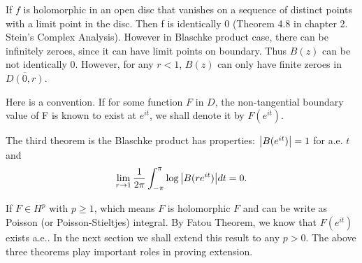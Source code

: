 \begin{remark}
    If $f$ is holomorphic in an open disc that vanishes on a sequence of distinct points with a limit point in the disc.
    Then f is identically 0 (Theorem 4.8 in chapter 2. Stein's Complex Analysis). However in Blaschke product case, there can
    be infinitely zeroes, since it can have limit points on boundary. Thus $B(z)$ can be not identically 0. However, for any $r<1$,
    $B(z)$ can only have finite zeroes in $\overline{D(0,r)}$.
\end{remark}
Here is a convention. If for some function $F$ in $D$, the non-tangential boundary value of F is known to exist at $e^{it}$, we shall denote it by
$F(e^{it})$. \par
The third theorem is the Blaschke
product has properties: $\left\lvert B(e^{it})\right\rvert=1$ for a.e. $t$ and
\begin{equation*}
    \lim_{r\to 1}{\frac{1}{2\pi}\int_{-\pi}^\pi{\log{\left\lvert B(re^{it})\right\rvert}d t}}=0.
\end{equation*}\par
If $F\in H^p$ with $p\geq 1$, which means $F$ is holomorphic $F$ and can be write as Poisson (or Poisson-Stieltjes) integral. By Fatou Theorem, we know that $F(e^{it})$ exists a.e..
In the next section we shall extend this result to any $p>0$. The above three theorems play important roles in proving extension.\par

